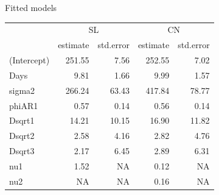 
\begin{frame}[fragile]{Fitted models}
\protect\hypertarget{fitted-models}{}

\scriptsize

\begin{Shaded}
\begin{Highlighting}[]
\NormalTok{(}\OperatorTok{$}\NormalTok{),}\OperatorTok{$}\NormalTok{),}
\OperatorTok{$}\OperatorTok{$}
\end{Highlighting}
\end{Shaded}

\begin{longtable}[]{@{}lrrrr@{}}
\toprule
& \multicolumn{2}{c}{{SL}} &\multicolumn{2}{c}{{CN}}\tabularnewline
& estimate & std.error & estimate & std.error\tabularnewline
\midrule
\endhead
(Intercept) & 251.55 & 7.56 & 252.55 & 7.02\tabularnewline
Days & 9.81 & 1.66 & 9.99 & 1.57\tabularnewline
sigma2 & 266.24 & 63.43 & 417.84 & 78.77\tabularnewline
phiAR1 & 0.57 & 0.14 & 0.56 & 0.14\tabularnewline
Dsqrt1 & 14.21 & 10.15 & 16.90 & 11.82\tabularnewline
Dsqrt2 & 2.58 & 4.16 & 2.82 & 4.76\tabularnewline
Dsqrt3 & 2.17 & 6.45 & 2.89 & 6.31\tabularnewline
nu1 & 1.52 & NA & 0.12 & NA\tabularnewline
nu2& NA & NA & 0.16 & NA\tabularnewline
\bottomrule
\end{longtable}

\end{frame}


